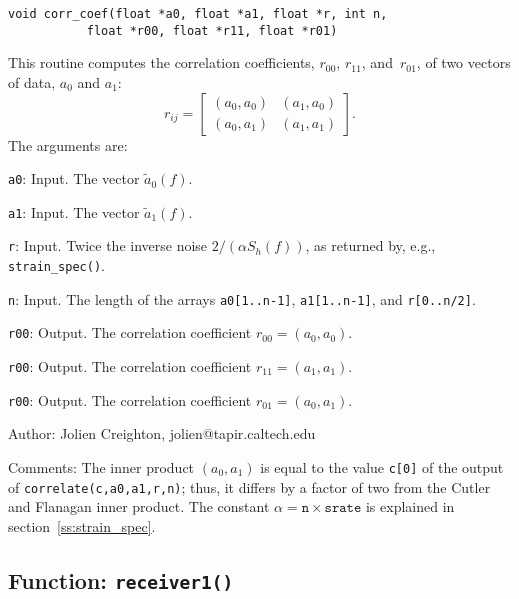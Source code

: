 \begin{verbatim}
void corr_coef(float *a0, float *a1, float *r, int n,
	       float *r00, float *r11, float *r01)
\end{verbatim}

This routine computes the correlation coefficients, $r_{00}$, $r_{11}$,
and~$r_{01}$, of two vectors of data, $a_0$ and $a_1$:
\begin{equation}
  r_{ij} = \left[
    \begin{array}{cc}
      (a_0,a_0) & (a_1,a_0) \\[6pt]
      (a_0,a_1) & (a_1,a_1)
    \end{array}
  \right].
\end{equation}
The arguments are:
\begin{description}
\item{\texttt{a0}}: Input.  The vector $\tilde{a}_0(f)$.
\item{\texttt{a1}}: Input.  The vector $\tilde{a}_1(f)$.
\item{\texttt{r}}: Input.  Twice the inverse noise $2/(\alpha S_h(f))$,
  as returned by, e.g., \texttt{strain\_spec()}.
\item{\texttt{n}}: Input.  The length of the arrays \texttt{a0[1..n-1]},
  \texttt{a1[1..n-1]}, and \texttt{r[0..n/2]}.
\item{\texttt{r00}}: Output.  The correlation coefficient $r_{00}=(a_0,a_0)$.
\item{\texttt{r00}}: Output.  The correlation coefficient $r_{11}=(a_1,a_1)$.
\item{\texttt{r00}}: Output.  The correlation coefficient $r_{01}=(a_0,a_1)$.
\end{description}

\begin{description}
\item{Author:} Jolien Creighton, jolien@tapir.caltech.edu
\item{Comments:} The inner product $(a_0,a_1)$ is equal to the value
  \texttt{c[0]} of the output of \texttt{correlate(c,a0,a1,r,n)}; thus,
  it differs by a factor of two from the Cutler and Flanagan inner product.
  The constant $\alpha=\texttt{n}\times\texttt{srate}$ is explained in
  section~\ref{ss:strain_spec}.
\end{description}


\clearpage
\subsection{Function: \texttt{receiver1()}}
\label{ss:receiver1}

